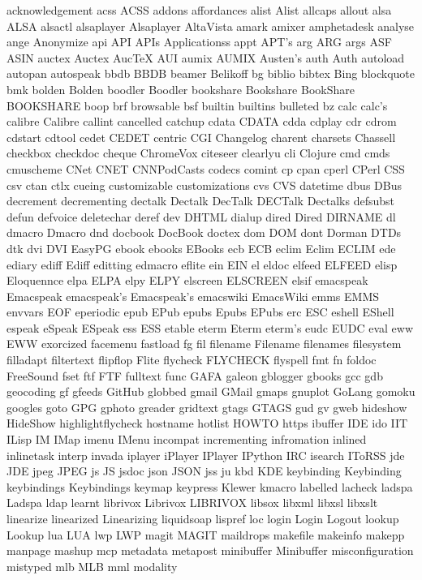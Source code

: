 acknowledgement
acss
ACSS
addons
affordances
alist
Alist
allcaps
allout
alsa
ALSA
alsactl
alsaplayer
Alsaplayer
AltaVista
amark
amixer
amphetadesk
analyse
ange
Anonymize
api
API
APIs
Applicationss
appt
APT's
arg
ARG
args
ASF
ASIN
auctex
Auctex
AucTeX
AUI
aumix
AUMIX
Austen's
auth
Auth
autoload
autopan
autospeak
bbdb
BBDB
beamer
Belikoff
bg
biblio
bibtex
Bing
blockquote
bmk
bolden
Bolden
boodler
Boodler
bookshare
Bookshare
BookShare
BOOKSHARE
boop
brf
browsable
bsf
builtin
builtins
bulleted
bz
calc
calc's
calibre
Calibre
callint
cancelled
catchup
cdata
CDATA
cdda
cdplay
cdr
cdrom
cdstart
cdtool
cedet
CEDET
centric
CGI
Changelog
charent
charsets
Chassell
checkbox
checkdoc
cheque
ChromeVox
citeseer
clearlyu
cli
Clojure
cmd
cmds
cmuscheme
CNet
CNET
CNNPodCasts
codecs
comint
cp
cpan
cperl
CPerl
CSS
csv
ctan
ctlx
cueing
customizable
customizations
cvs
CVS
datetime
dbus
DBus
decrement
decrementing
dectalk
Dectalk
DecTalk
DECTalk
Dectalks
defsubst
defun
defvoice
deletechar
deref
dev
DHTML
dialup
dired
Dired
DIRNAME
dl
dmacro
Dmacro
dnd
docbook
DocBook
doctex
dom
DOM
dont
Dorman
DTDs
dtk
dvi
DVI
EasyPG
ebook
ebooks
EBooks
ecb
ECB
eclim
Eclim
ECLIM
ede
ediary
ediff
Ediff
editting
edmacro
eflite
ein
EIN
el
eldoc
elfeed
ELFEED
elisp
Eloquennce
elpa
ELPA
elpy
ELPY
elscreen
ELSCREEN
elsif
emacspeak
Emacspeak
emacspeak's
Emacspeak's
emacswiki
EmacsWiki
emms
EMMS
envvars
EOF
eperiodic
epub
EPub
epubs
Epubs
EPubs
erc
ESC
eshell
EShell
espeak
eSpeak
ESpeak
ess
ESS
etable
eterm
Eterm
eterm's
eudc
EUDC
eval
eww
EWW
exorcized
facemenu
fastload
fg
fil
filename
Filename
filenames
filesystem
filladapt
filtertext
flipflop
Flite
flycheck
FLYCHECK
flyspell
fmt
fn
foldoc
FreeSound
fset
ftf
FTF
fulltext
func
GAFA
galeon
gblogger
gbooks
gcc
gdb
geocoding
gf
gfeeds
GitHub
globbed
gmail
GMail
gmaps
gnuplot
GoLang
gomoku
googles
goto
GPG
gphoto
greader
gridtext
gtags
GTAGS
gud
gv
gweb
hideshow
HideShow
highlightflycheck
hostname
hotlist
HOWTO
https
ibuffer
IDE
ido
IIT
ILisp
IM
IMap
imenu
IMenu
incompat
incrementing
infromation
inlined
inlinetask
interp
invada
iplayer
iPlayer
IPlayer
IPython
IRC
isearch
IToRSS
jde
JDE
jpeg
JPEG
js
JS
jsdoc
json
JSON
jss
ju
kbd
KDE
keybinding
Keybinding
keybindings
Keybindings
keymap
keypress
Klewer
kmacro
labelled
lacheck
ladspa
Ladspa
ldap
learnt
librivox
Librivox
LIBRIVOX
libsox
libxml
libxsl
libxslt
linearize
linearized
Linearizing
liquidsoap
lispref
loc
login
Login
Logout
lookup
Lookup
lua
LUA
lwp
LWP
magit
MAGIT
maildrops
makefile
makeinfo
makepp
manpage
mashup
mcp
metadata
metapost
minibuffer
Minibuffer
misconfiguration
mistyped
mlb
MLB
mml
modality
